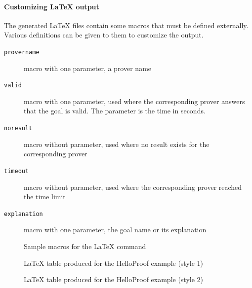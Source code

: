\paragraph{Customizing LaTeX output}

The generated LaTeX files contain some macros that must be defined
externally.  Various definitions can be given to them to customize the
output.
\begin{description}
\item[\texttt{\bs{}provername}] macro with one parameter, a prover name
\item[\texttt{\bs{}valid}] macro with one parameter, used where the corresponding prover answers that the goal is valid. The parameter is the time in seconds.
\item[\texttt{\bs{}noresult}] macro without parameter, used where no result
  exists for the corresponding prover
\item[\texttt{\bs{}timeout}] macro without parameter, used where the corresponding prover reached the time limit
\item[\texttt{\bs{}explanation}] macro with one parameter, the goal name or its explanation
\end{description}

\begin{figure}[t]
\begin{center}

\end{center}
\caption{Sample macros for the LaTeX command}
\label{fig:custom-latex}
\end{figure}

\begin{figure}[t]
\begin{center}

\end{center}
\caption{LaTeX table produced for the HelloProof example (style 1)}
\label{fig:latex}
\end{figure}

\begin{figure}[t]
\begin{center}

\end{center}
\caption{LaTeX table produced for the HelloProof example (style 2)}
\label{fig:latexstyle2}
\end{figure}

